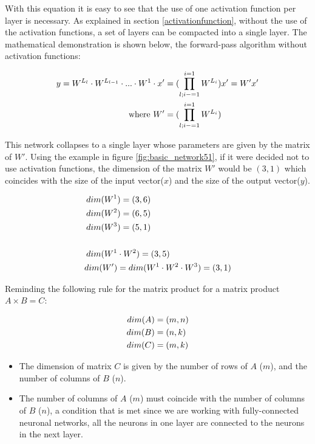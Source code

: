 With this equation it is easy to see that the use of one activation function per layer is necessary. As explained in section \ref{activationfunction}, without the use of the activation functions, a set of layers can be compacted into a single layer. The mathematical demonstration is shown below, the forward-pass algorithm without activation functions:

\begin{equation}
\centering
    \begin{split}
    y = W^{L_l} \cdot W^{L_{l-1}} \cdot ... \cdot W^{1} \cdot x' &= (\prod_{l;i-=1}^{i=1} W^{L_i})x' = W'x'\\
    \text{where}~W' &= (\prod_{l;i-=1}^{i=1} W^{L_i})
  \end{split}
    \label{eqn:feedforwardnoactivation}
\end{equation}


This network collapses to a single layer whose parameters are given by the matrix of $W'$. Using the example in figure \ref{fig:basic_network51}, if it were decided not to use activation functions, the dimension of the matrix $W'$ would be $(3,1)$ which coincides with the size of the input vector($x$) and the size of the output vector($y$).

\begin{equation}
\centering
    \begin{split}
    dim(W^1&) = (3,6) \\
    dim(W^2&) = (6,5) \\
    dim(W^3&) = (5,1) \\ \\
    dim(W^1 &\cdot W^2) = (3,5)\\
    dim(W') &= dim(W^1 \cdot W^2 \cdot W^3) = (3,1)
    \end{split}
\end{equation}


Reminding the following rule for the matrix product for a matrix product $A \times B = C$:

\begin{equation}
\centering
    \begin{split}
    dim(A) &= (m, n) \\
    dim(B) &= (n, k) \\
    dim(C) &= (m, k)
    \end{split}
    \label{eqn:dimensions}
\end{equation}

\begin{itemize}
    \item The dimension of matrix $C$ is given by the number of rows of $A$ ($m$), and the number of columns of $B$ ($n$).
    \item The number of columns of $A$ ($m$) must coincide with the number of columns of $B$ ($n$), a condition that is met since we are working with fully-connected neuronal networks, all the neurons in one layer are connected to the neurons in the next layer.
\end{itemize}


